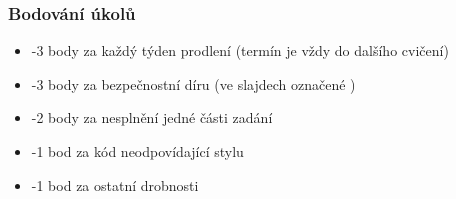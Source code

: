 \begin{frame}
  \frametitle{Bodování úkolů}

  \begin{itemize}
    \item -3 body za každý týden prodlení (termín je vždy do dalšího cvičení)
    \item -3 body za bezpečnostní díru (ve slajdech označené \pozor)
    \item -2 body za nesplnění jedné části zadání
    \item -1 bod za kód neodpovídající stylu
    \item -1 bod za ostatní drobnosti
  \end{itemize}

\end{frame}




